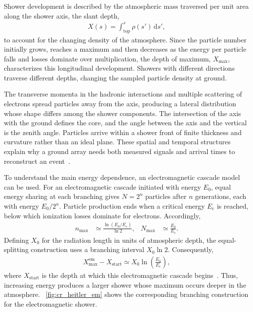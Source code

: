 \documentclass[main.tex]{subfiles}
\begin{document}
Shower development is described by the atmospheric mass traversed per unit area along the shower axis, the slant depth,
\begin{align}
    X(s)=\int_{\mathrm{top}}^{s}\rho(s')\,\mathrm{d}s',
    \label{eq:cr_depth}
\end{align}
to account for the changing density of the atmosphere.
Since the particle number initially grows, reaches a maximum and then decreases as the energy per particle falls and losses dominate over multiplication, the depth of maximum, $X_{\max}$, characterizes this longitudinal development.
Showers with different directions traverse different depths, changing the sampled particle density at ground.

The transverse momenta in the hadronic interactions and multiple scattering of electrons spread particles away from the axis, producing a lateral distribution whose shape differs among the shower components.
The intersection of the axis with the ground defines the core, and the angle between the axis and the vertical is the zenith angle.
Particles arrive within a shower front of finite thickness and curvature rather than an ideal plane.
These spatial and temporal structures explain why a ground array needs both measured signals and arrival times to reconstruct an event~\cite{grupenAstroparticlePhysics2020}.

To understand the main energy dependence, an electromagnetic cascade model can be used.
For an electromagnetic cascade initiated with energy $E_0$, equal energy sharing at each branching gives $N=2^n$ particles after $n$ generations, each with energy $E_0/2^n$.
Particle production ends when a critical energy $E_{\mathrm{c}}$ is reached, below which ionization losses dominate for electrons.
Accordingly,
\begin{align}
    n_{\max}&\simeq\frac{\ln(E_0/E_{\mathrm{c}})}{\ln 2}, &
    N_{\max}&\simeq\frac{E_0}{E_{\mathrm{c}}} .
    \label{eq:cr_heitler}
\end{align}
Defining $X_0$ for the radiation length in units of atmospheric depth, the equal-splitting construction uses a branching interval $X_0\ln2$.
Consequently,
\begin{align}
    X_{\max}^{\mathrm{em}}-X_{\mathrm{start}}
    \simeq X_0\ln\!\left(\frac{E_0}{E_{\mathrm{c}}}\right),
    \label{eq:cr_heitler_depth}
\end{align}
where $X_{\mathrm{start}}$ is the depth at which this electromagnetic cascade begins~\cite{Longair:2011:HighEnergyAstrohphysics}.
Thus, increasing energy produces a larger shower whose maximum occurs deeper in the atmosphere.
~\cref{fig:cr_heitler_em} shows the corresponding branching construction for the electromagnetic shower.
\end{document}
